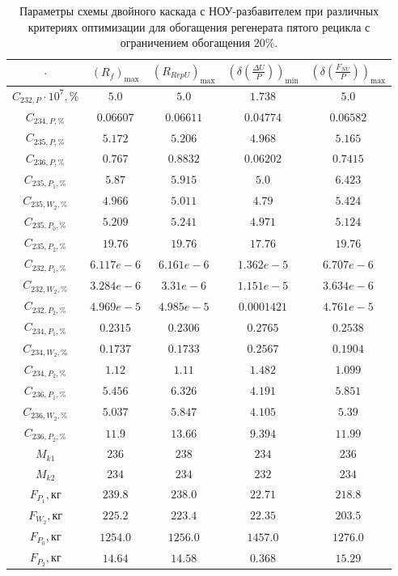 \begin{table}
    \begin{tabular}{ccccc}
        $\cdot$ & $(R_f)_\text{max}$ & $(R_{RepU})_\text{max}$ & $(\delta(\frac{\Delta U}{P}))_\text{min}$ & $(\delta(\frac{F_{NU}}{P}))_\text{max}$\\ \hline
        $C_{232,P}\cdot10^{7}, \%$ & $5.0$ & $5.0$ & $1.738$ & $5.0$\\ \hline
        $C_{234,P, \%}$ & $0.06607$ & $0.06611$ & $0.04774$ & $0.06582$\\ \hline
        $C_{235,P, \%}$ & $5.172$ & $5.206$ & $4.968$ & $5.165$\\ \hline
        $C_{236,P, \%}$ & $0.767$ & $0.8832$ & $0.06202$ & $0.7415$\\ \hline
        $C_{235,P_1, \%}$ & $5.87$ & $5.915$ & $5.0$ & $6.423$\\ \hline
        $C_{235,W_2, \%}$ & $4.966$ & $5.011$ & $4.79$ & $5.424$\\ \hline
        $C_{235,P_0, \%}$ & $5.209$ & $5.241$ & $4.971$ & $5.124$\\ \hline
        $C_{235,P_2, \%}$ & $19.76$ & $19.76$ & $17.76$ & $19.76$\\ \hline
        $C_{232,P_1, \%}$ & $6.117e-6$ & $6.161e-6$ & $1.362e-5$ & $6.707e-6$\\ \hline
        $C_{232,W_2, \%}$ & $3.284e-6$ & $3.31e-6$ & $1.151e-5$ & $3.634e-6$\\ \hline
        $C_{232,P_2, \%}$ & $4.969e-5$ & $4.985e-5$ & $0.0001421$ & $4.761e-5$\\ \hline
        $C_{234,P_1, \%}$ & $0.2315$ & $0.2306$ & $0.2765$ & $0.2538$\\ \hline
        $C_{234,W_2, \%}$ & $0.1737$ & $0.1733$ & $0.2567$ & $0.1904$\\ \hline
        $C_{234,P_2, \%}$ & $1.12$ & $1.11$ & $1.482$ & $1.099$\\ \hline
        $C_{236,P_1, \%}$ & $5.456$ & $6.326$ & $4.191$ & $5.851$\\ \hline
        $C_{236,W_2, \%}$ & $5.037$ & $5.847$ & $4.105$ & $5.39$\\ \hline
        $C_{236,P_2, \%}$ & $11.9$ & $13.66$ & $9.394$ & $11.99$\\ \hline
        $M_{k1}$ & $236$ & $238$ & $234$ & $236$\\ \hline
        $M_{k2}$ & $234$ & $234$ & $232$ & $234$\\ \hline
        $F_{P_1}, \text{кг}$ & $239.8$ & $238.0$ & $22.71$ & $218.8$\\ \hline
        $F_{W_2}, \text{кг}$ & $225.2$ & $223.4$ & $22.35$ & $203.5$\\ \hline
        $F_{P_0}, \text{кг}$ & $1254.0$ & $1256.0$ & $1457.0$ & $1276.0$\\ \hline
        $F_{P_2}, \text{кг}$ & $14.64$ & $14.58$ & $0.368$ & $15.29$\\ \hline
    \end{tabular}
    \caption{Параметры схемы двойного каскада с НОУ-разбавителем при различных критериях оптимизации для обогащения регенерата пятого рецикла с ограничением обогащения 20\%.{\label{2opt5_20}}}
\end{table}


